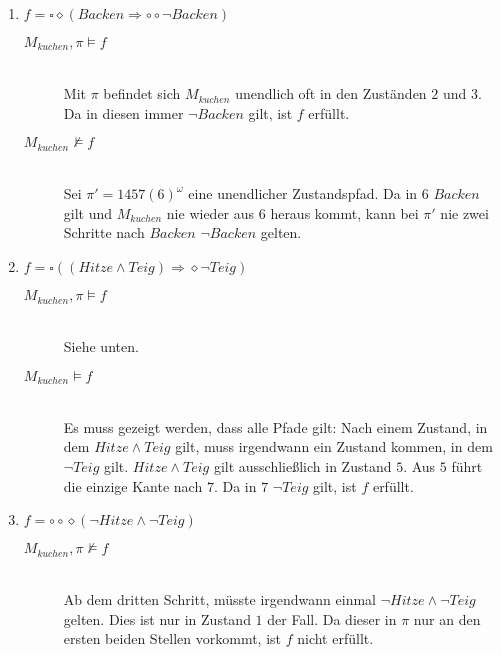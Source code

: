 \documentclass[a4paper]{scrartcl}
\begin{document}
\begin{enumerate}
\begin{description}
        \end{description}

    \item $f = \square\diamond(Backen \Rightarrow \circ\circ\lnot Backen)$
        \begin{description}
            \item[$M_{kuchen}, \pi \models f$] \hfill \\
                Mit $\pi$ befindet sich $M_{kuchen}$ unendlich oft in den
                Zuständen $2$ und $3$.
                Da in diesen immer $\lnot Backen$ gilt, ist $f$ erfüllt.

            \item[$M_{kuchen} \not\models f$] \hfill \\
                Sei $\pi' = 1457(6)^\omega$ eine unendlicher Zustandspfad.
                Da in $6$ $Backen$ gilt und $M_{kuchen}$ nie wieder aus $6$
                heraus kommt, kann bei $\pi'$ nie zwei Schritte nach $Backen$
                $\lnot Backen$ gelten.

        \end{description}

    \item $f = \square((Hitze \land Teig) \Rightarrow \diamond\lnot Teig)$
        \begin{description}
            \item[$M_{kuchen}, \pi \models f$] \hfill \\
                Siehe unten.

            \item[$M_{kuchen} \models f$] \hfill \\
                Es muss gezeigt werden, dass alle Pfade gilt: Nach einem
                Zustand, in dem $Hitze \land Teig$ gilt, muss irgendwann ein
                Zustand kommen, in dem $\lnot Teig$ gilt.
                $Hitze \land Teig$ gilt ausschließlich in Zustand $5$.
                Aus $5$ führt die einzige Kante nach $7$.
                Da in $7$ $\lnot Teig$ gilt, ist $f$ erfüllt.

        \end{description}

    \item $f = \circ\circ\diamond(\lnot Hitze \land \lnot Teig)$
        \begin{description}
            \item[$M_{kuchen}, \pi \not\models f$] \hfill \\
                Ab dem dritten Schritt, müsste irgendwann einmal
                $\lnot Hitze \land \lnot Teig$ gelten.
                Dies ist nur in Zustand $1$ der Fall.
                Da dieser in $\pi$ nur an den ersten beiden Stellen vorkommt,
                ist $f$ nicht erfüllt.


\end{description}
\end{enumerate}
\end{document}
